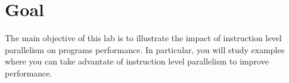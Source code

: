 \section{Goal}

The main objective of this lab is to illustrate the impact
of instruction level parallelism on programs performance.
In particular, you will study examples where you can take advantate
of instruction level parallelism to improve performance.

